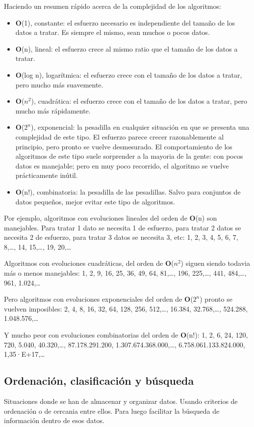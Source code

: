\documentclass[spanish,12pt,a4paper,final,oneside]{book}
\begin{document}
Haciendo un resumen rápido acerca de la complejidad de los algoritmos:
\begin{itemize}
    \item \textbf{O}(1), constante: el esfuerzo necesario es independiente del tamaño de los datos a tratar. Es siempre el mismo, sean muchos o pocos datos.
    \item \textbf{O}(n), lineal: el esfuerzo crece al mismo ratio que el tamaño de los datos a tratar.
    \item \textbf{O}(log n), logarítmica: el esfuerzo crece con el tamaño de los datos a tratar, pero mucho más suavemente.
    \item \textbf{O}($n^{2}$), cuadrática: el esfuerzo crece con el tamaño de los datos a tratar, pero mucho más rápidamente.
    \item \textbf{O}($2^{n}$), exponencial: la pesadilla en cualquier situación en que se presenta una complejidad de este tipo. El esfuerzo parece crecer razonablemente al principio, pero pronto se vuelve desmesurado. El comportamiento de los algoritmos de este tipo suele sorprender a la mayoria de la gente: con pocos datos es manejable; pero en muy poco recorrido, el algoritmo se vuelve prácticamente inútil.
    \item \textbf{O}(n!), combinatoria: la pesadilla de las pesadillas. Salvo para conjuntos de datos pequeños, mejor evitar este tipo de algoritmos.
\end{itemize}

Por ejemplo, algoritmos con evoluciones lineales del orden de \textbf{O}(n) son manejables. Para tratar 1 dato se necesita 1 de esfuerzo, para tratar 2 datos se necesita 2 de esfuerzo, para tratar 3 datos se necesita 3, etc: 1, 2, 3, 4, 5, 6, 7, 8,\ldots, 14, 15,\ldots, 19, 20,\ldots 

Algoritmos con evoluciones cuadráticas, del orden de \textbf{O}($n^{2}$) siguen siendo todavia más o menos manejables: 1, 2, 9, 16, 25, 36, 49, 64, 81,\ldots, 196, 225,\ldots, 441, 484,\ldots, 961, 1.024,\ldots

Pero algoritmos con evoluciones exponenciales del orden de \textbf{O}($2^n$) pronto se vuelven imposibles: 2, 4, 8, 16, 32, 64, 128, 256, 512,\ldots, 16.384, 32.768,\ldots, 524.288, 1.048.576,\ldots 

Y mucho peor con evoluciones combinatorias del orden de \textbf{O}(n!): 1, 2, 6, 24, 120, 720, 5.040, 40.320,\ldots, 87.178.291.200, 1.307.674.368.000,\ldots, 6.758.061.133.824.000, 1,35·E+17,\ldots


\subsection{Ordenación, clasificación y búsqueda}
Situaciones donde se han de almacenar y organizar datos.  Usando criterios de ordenación o de cercania entre ellos. Para luego facilitar la búsqueda de información dentro de esos datos.
\end{document}
